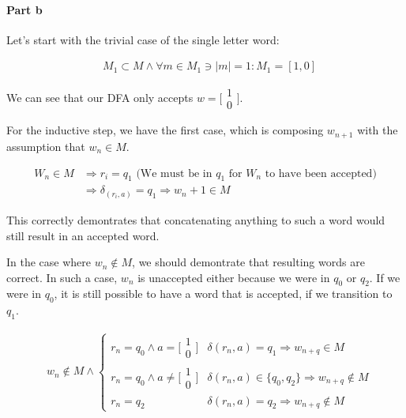 \documentclass{article}
\begin{document}
\paragraph{Part b}

Let's start with the trivial case of the single letter word:

\begin{align*}
    &M_1 \subset M \land \forall m \in M_1 \ni |m| = 1 : M_1 = [1,0]
\end{align*}

We can see that our DFA only accepts $w=\bigl[\begin{smallmatrix}1\\0\end{smallmatrix}\bigr]$.

For the inductive step, we have the first case, which is composing $w_{n+1}$ with the assumption
that $w_n \in M$.

\begin{align*}
    W_n \in M &\Rightarrow r_i = q_1 \textrm{ (We must be in $q_1$ for $W_n$ to have been accepted)} \\
    & \Rightarrow \delta_(r_i, a) = q_1 \Rightarrow w_n+1 \in M 
\end{align*}

This correctly demontrates that concatenating anything to such a word would still result in an accepted word.

In the case where $w_n \notin M$, we should demontrate that resulting words are correct. In such a case, $w_n$
is unaccepted either because we were in $q_0$ or $q_2$. If we were in $q_0$, it is still possible to have a word
that is accepted, if we transition to $q_1$.

\begin{align*}
    &w_n \notin M \wedge \begin{cases}
        r_n = q_0 \wedge a = \bigl[\begin{smallmatrix}1\\0\end{smallmatrix}\bigr] & \delta(r_n,a)=q_1 \Rightarrow w_{n+q}\in M \\
        r_n = q_0 \wedge a \neq \bigl[\begin{smallmatrix}1\\0\end{smallmatrix}\bigr] & \delta(r_n,a) \in \{ q_0, q_2 \} \Rightarrow w_{n+q}\notin M \\
        r_n = q_2 & \delta(r_n,a) = q_2 \Rightarrow w_{n+q}\notin M
    \end{cases}
\end{align*}
\end{document}
